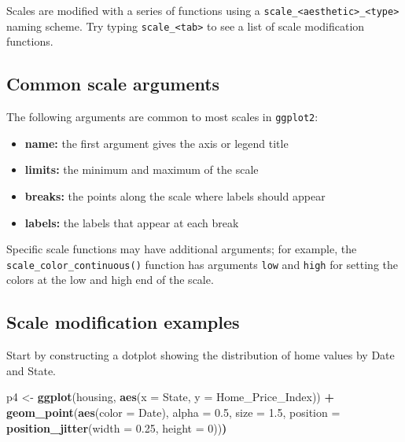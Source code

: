 \documentclass[]{book}
\newenvironment{Shaded}{\begin{snugshade}}{\end{snugshade}}
\newcommand{\KeywordTok}[1]{\textcolor[rgb]{0.13,0.29,0.53}{\textbf{#1}}}
\newcommand{\DataTypeTok}[1]{\textcolor[rgb]{0.13,0.29,0.53}{#1}}
\newcommand{\DecValTok}[1]{\textcolor[rgb]{0.00,0.00,0.81}{#1}}
\newcommand{\FloatTok}[1]{\textcolor[rgb]{0.00,0.00,0.81}{#1}}
\newcommand{\StringTok}[1]{\textcolor[rgb]{0.31,0.60,0.02}{#1}}
\newcommand{\OperatorTok}[1]{\textcolor[rgb]{0.81,0.36,0.00}{\textbf{#1}}}
\newcommand{\ErrorTok}[1]{\textcolor[rgb]{0.64,0.00,0.00}{\textbf{#1}}}
\newcommand{\NormalTok}[1]{#1}
\providecommand{\tightlist}{%
  \setlength{\itemsep}{0pt}\setlength{\parskip}{0pt}}
\begin{document}
Scales are modified with a series of functions using a
\texttt{scale\_\textless{}aesthetic\textgreater{}\_\textless{}type\textgreater{}}
naming scheme. Try typing \texttt{scale\_\textless{}tab\textgreater{}}
to see a list of scale modification functions.

\subsection{Common scale arguments}\label{common-scale-arguments}

The following arguments are common to most scales in \texttt{ggplot2}:

\begin{itemize}
\tightlist
\item
  \textbf{name:} the first argument gives the axis or legend title
\item
  \textbf{limits:} the minimum and maximum of the scale
\item
  \textbf{breaks:} the points along the scale where labels should appear
\item
  \textbf{labels:} the labels that appear at each break
\end{itemize}

Specific scale functions may have additional arguments; for example, the
\texttt{scale\_color\_continuous()} function has arguments \texttt{low}
and \texttt{high} for setting the colors at the low and high end of the
scale.

\subsection{Scale modification
examples}\label{scale-modification-examples}

Start by constructing a dotplot showing the distribution of home values
by Date and State.

\begin{Shaded}
\begin{Highlighting}[]
\NormalTok{p4 <-}\StringTok{ }\KeywordTok{ggplot}\NormalTok{(housing, }\KeywordTok{aes}\NormalTok{(}\DataTypeTok{x =}\NormalTok{ State, }\DataTypeTok{y =}\NormalTok{ Home_Price_Index)) }\OperatorTok{+}\StringTok{ }
\StringTok{    }\KeywordTok{geom_point}\NormalTok{(}\KeywordTok{aes}\NormalTok{(}\DataTypeTok{color =}\NormalTok{ Date), }\DataTypeTok{alpha =} \FloatTok{0.5}\NormalTok{, }\DataTypeTok{size =} \FloatTok{1.5}\NormalTok{,}
               \DataTypeTok{position =} \KeywordTok{position_jitter}\NormalTok{(}\DataTypeTok{width =} \FloatTok{0.25}\NormalTok{, }\DataTypeTok{height =} \DecValTok{0}\NormalTok{))}\ErrorTok{)}
\end{Highlighting}
\end{Shaded}
\end{document}
